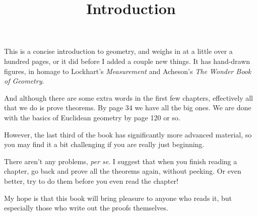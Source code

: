\documentclass[11pt, oneside]{article}
\title{Introduction}
\date{}
\begin{document}
\maketitle
\Large


This is a concise introduction to geometry, and weighs in at a little over a hundred pages, or it did before I added a couple new things.  It has hand-drawn figures, in homage to Lockhart's  \emph{Measurement} and Acheson's \emph{The Wonder Book of Geometry}.

And although there are some extra words in the first few chapters, effectively all that we do is prove theorems.  By page 34 we have all the big ones.  We are done with the basics of Euclidean geometry by page 120 or so.

However, the last third of the book has significantly more advanced material, so you may find it a bit challenging if you are really just beginning.

There aren't any problems, \emph{per se}.  I suggest that when you finish reading a chapter, go back and prove all the theorems again, without peeking.  Or even better, try to do them before you even read the chapter!

My hope is that this book will bring pleasure to anyone who reads it, but especially those who write out the proofs themselves.
\end{document}
